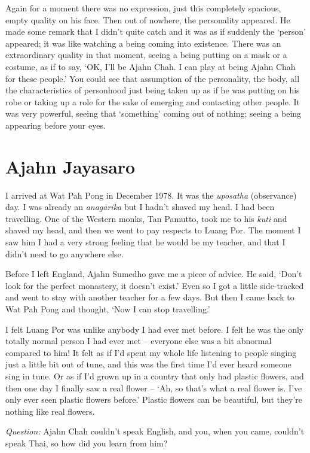 Again for a moment there was no expression, just this completely
spacious, empty quality on his face. Then out of nowhere, the
personality appeared. He made some remark that I didn't quite catch and
it was as if suddenly the `person' appeared; it was like watching a
being coming into existence. There was an extraordinary quality in that
moment, seeing a being putting on a mask or a costume, as if to say, 
`OK, I'll be Ajahn Chah. I can play at being Ajahn Chah for these
people.' You could see that assumption of the personality, the body, all
the characteristics of personhood just being taken up as if he was
putting on his robe or taking up a role for the sake of emerging and
contacting other people. It was very powerful, seeing that `something'
coming out of nothing; seeing a being appearing before your eyes. 

\section{Ajahn Jayasaro}

I arrived at Wat Pah Pong in December 1978. It was the \emph{uposatha}
 (observance) day. I was already an \emph{anagārika} but I hadn't shaved
my head. I had been travelling. One of the Western monks, Tan Pamutto, 
took me to his \emph{kuti} and shaved my head, and then we went to pay
respects to Luang Por. The moment I saw him I had a very strong feeling
that he would be my teacher, and that I didn't need to go anywhere else. 

Before I left England, Ajahn Sumedho gave me a piece of advice. He said, 
`Don't look for the perfect monastery, it doesn't exist.' Even so I got
a little side-tracked and went to stay with another teacher for a few
days. But then I came back to Wat Pah Pong and thought, `Now I can stop
travelling.'

I felt Luang Por was unlike anybody I had ever met before. I felt he was
the only totally normal person I had ever met -- everyone else was a bit
abnormal compared to him! It felt as if I'd spent my whole life
listening to people singing just a little bit out of tune, and this was
the first time I'd ever heard someone sing in tune. Or as if I'd grown
up in a country that only had plastic flowers, and then one day I
finally saw a real flower -- `Ah, so that's what a real flower is. I've
only ever seen plastic flowers before.' Plastic flowers can be
beautiful, but they're nothing like real flowers. 

\emph{Question:} Ajahn Chah couldn't speak English, and you, when you
came, couldn't speak Thai, so how did you learn from him? 

